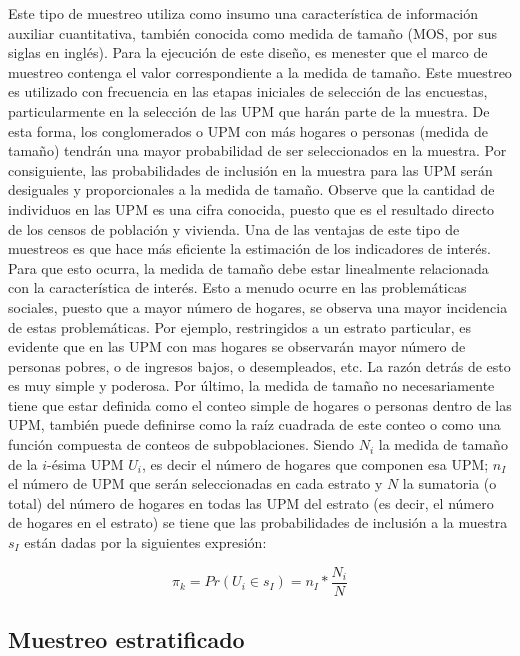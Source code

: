 Este tipo de muestreo utiliza como insumo una característica de información auxiliar cuantitativa, también conocida como medida de tamaño (MOS, por sus siglas en inglés). Para la ejecución de este diseño, es menester que el marco de muestreo contenga el valor correspondiente a la medida de tamaño. Este muestreo es utilizado con frecuencia en las etapas iniciales de selección de las encuestas, particularmente en la selección de las UPM que harán parte de la muestra. De esta forma, los conglomerados o UPM con más hogares o personas (medida de tamaño) tendrán una mayor probabilidad de ser seleccionados en la muestra. Por consiguiente, las probabilidades de inclusión en la muestra para las UPM serán desiguales y proporcionales a la medida de tamaño. Observe que la cantidad de individuos en las UPM es una cifra conocida, puesto que es el resultado directo de los censos de población y vivienda.
Una de las ventajas de este tipo de muestreos es que hace más eficiente la estimación de los indicadores de interés. Para que esto ocurra, la medida de tamaño debe estar linealmente relacionada con la característica de interés. Esto a menudo ocurre en las problemáticas sociales, puesto que a mayor número de hogares, se observa una mayor incidencia de estas problemáticas. Por ejemplo, restringidos a un estrato particular, es evidente que en las UPM con mas hogares se observarán mayor número de personas pobres, o de ingresos bajos, o desempleados, etc. La razón detrás de esto es muy simple y poderosa. Por último, la medida de tamaño no necesariamente tiene que estar definida como el conteo simple de hogares o personas dentro de las UPM, también puede definirse como la raíz cuadrada de este conteo o como una función compuesta de conteos de subpoblaciones. Siendo \(N_i\) la medida de tamaño de la \(i\)-ésima UPM \(U_i\), es decir el número de hogares que componen esa UPM; \(n_I\) el número de UPM que serán seleccionadas en cada estrato y \(N\) la sumatoria (o total) del número de hogares en todas las UPM del estrato (es decir, el número de hogares en el estrato) se tiene que las probabilidades de inclusión a la muestra \(s_I\) están dadas por la siguientes expresión:

\[\pi_k = Pr(U_i \in s_I) = n_I * \frac{N_i}{N}\]

\hypertarget{muestreo-estratificado}{%
\subsection*{Muestreo estratificado}\label{muestreo-estratificado}}


